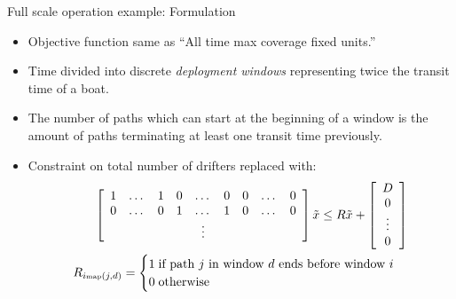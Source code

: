 \documentclass[xcolor=pdflatex,dvipsnames,table]{beamer}
\begin{document}
\begin{frame}{Full scale operation example: Formulation}
\small
\begin{itemize}
 \item Objective function same as ``All time max coverage fixed units.''
 \item Time divided into discrete \emph{deployment windows} representing twice the transit time of a boat. 
 \item The number of paths which can start at the beginning of a window is the amount of paths terminating at least one transit time previously.
 \item Constraint on total number of drifters replaced with:
\begin{align*}
  \left[\begin{array}{ccccccccc}
   1&\dots&1&0&\dots&0&0&\dots&0\\
   0&\dots&0&1&\dots&1&0&\dots&0\\
   &&&&\vdots&&&&
  \end{array}\right] \tilde{x} \leq R \tilde{x} + \left[\begin{array}{c}D\\0\\\vdots\\0\end{array}\right]\\
 R_{i\mbox{\tiny map}(j,d)} = \begin{cases}
				1\;\mbox{if path $j$ in window $d$ ends before window $i$}\\
				0\;\mbox{otherwise}\\
				\end{cases}
\end{align*}

\end{itemize}
\end{frame}
\end{document}
